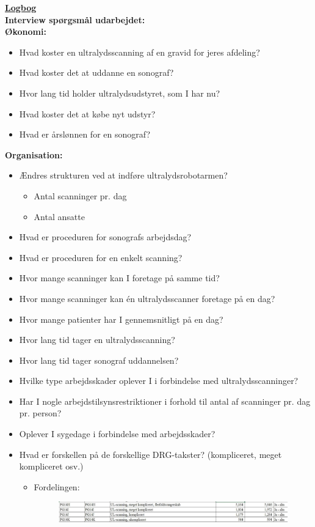 \underline{\textbf{Logbog}}\\
\textbf{Interview spørgsmål udarbejdet:}\\
\textbf{Økonomi:}
\begin{itemize}
\item Hvad koster en ultralydsscanning af en gravid for jeres afdeling?
\item Hvad koster det at uddanne en sonograf? 
\item Hvor lang tid holder ultralydsudstyret, som I har nu? 
\item Hvad koster det at købe nyt udstyr?
\item Hvad er årslønnen for en sonograf?
\end{itemize}
\textbf{Organisation:}
\begin{itemize}
\item Ændres strukturen ved at indføre ultralydsrobotarmen? 
\begin{itemize}
\item Antal scanninger pr. dag 
\item Antal ansatte
\end{itemize}
\item Hvad er proceduren for sonografs arbejdsdag?
\item Hvad er proceduren for en enkelt scanning?
\item Hvor mange scanninger kan I foretage på samme tid?
\item Hvor mange scanninger kan én ultralydsscanner foretage på en dag?
\item Hvor mange patienter har I gennemsnitligt på en dag? 
\item Hvor lang tid tager en ultralydsscanning?
\item Hvor lang tid tager sonograf uddannelsen?
\item Hvilke type arbejdsskader oplever I i forbindelse med ultralydsscanninger?
\item Har I nogle arbejdstilsynsrestriktioner i forhold til antal af scanninger pr. dag pr. person? 
\item Oplever I sygedage i forbindelse med arbejdsskader?
\item Hvad er forskellen på de forskellige DRG-takster? (kompliceret, meget kompliceret osv.)
\begin{itemize}
\item Fordelingen:
\begin{figure}[htb]
    \includegraphics{Figurer/scanning}
\end{figure}
\end{itemize}
\end{itemize}
